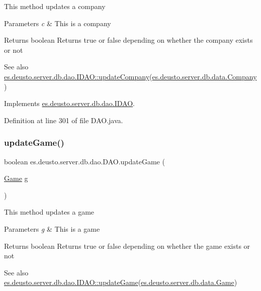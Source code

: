 This method updates a company 
\begin{DoxyParams}{Parameters}
{\em c} & This is a company \\
\hline
\end{DoxyParams}
\begin{DoxyReturn}{Returns}
boolean Returns true or false depending on whether the company exists or not 
\end{DoxyReturn}
\begin{DoxySeeAlso}{See also}
\hyperlink{interfacees_1_1deusto_1_1server_1_1db_1_1dao_1_1_i_d_a_o_a2d4302c61abd557f5a84d0698afdb814}{es.\+deusto.\+server.\+db.\+dao.\+I\+D\+A\+O\+::update\+Company}(\hyperlink{classes_1_1deusto_1_1server_1_1db_1_1data_1_1_company}{es.\+deusto.\+server.\+db.\+data.\+Company}) 
\end{DoxySeeAlso}


Implements \hyperlink{interfacees_1_1deusto_1_1server_1_1db_1_1dao_1_1_i_d_a_o_a2d4302c61abd557f5a84d0698afdb814}{es.\+deusto.\+server.\+db.\+dao.\+I\+D\+AO}.



Definition at line 301 of file D\+A\+O.\+java.

\mbox{\label{classes_1_1deusto_1_1server_1_1db_1_1dao_1_1_d_a_o_ae7540010b43f96c5e50995a8376614e7}} 
\subsubsection{\texorpdfstring{update\+Game()}{updateGame()}}
{\footnotesize\ttfamily boolean es.\+deusto.\+server.\+db.\+dao.\+D\+A\+O.\+update\+Game (\begin{DoxyParamCaption}\item[{\hyperlink{classes_1_1deusto_1_1server_1_1db_1_1data_1_1_game}{Game}}]{g }\end{DoxyParamCaption})}

This method updates a game 
\begin{DoxyParams}{Parameters}
{\em g} & This is a game \\
\hline
\end{DoxyParams}
\begin{DoxyReturn}{Returns}
boolean Returns true or false depending on whether the game exists or not 
\end{DoxyReturn}
\begin{DoxySeeAlso}{See also}
\hyperlink{interfacees_1_1deusto_1_1server_1_1db_1_1dao_1_1_i_d_a_o_a3a3ca0456879e35349a937aac661ff3f}{es.\+deusto.\+server.\+db.\+dao.\+I\+D\+A\+O\+::update\+Game}(\hyperlink{classes_1_1deusto_1_1server_1_1db_1_1data_1_1_game}{es.\+deusto.\+server.\+db.\+data.\+Game}) 
\end{DoxySeeAlso}


